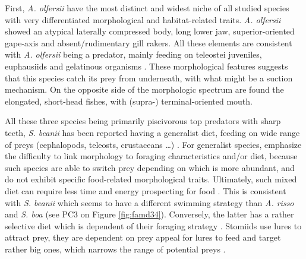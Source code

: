 

First, \textit{A. olfersii} have the most distinct and widest niche of all studied species with very differentiated morphological and habitat-related traits. \textit{A. olfersii} showed an atypical laterally compressed body, long lower jaw, superior-oriented gape-axis and absent/rudimentary gill rakers. All these elements are consistent with \textit{A. olfersii} being a predator, mainly feeding on teleostei juveniles, euphausiids and gelatinous organisms \citep{eduardo2020}. These morphological features suggests that this species catch its prey from underneath, with what might be a suction mechanism. On the opposite side of the morphologic spectrum are found the elongated, short-head fishes, with (supra-) terminal-oriented mouth. 

All these three species being primarily piscivorous top predators with sharp teeth, \textit{S. beanii} has been reported having a generalist diet, feeding on wide range of preys (cephalopods, teleosts, crustaceans \ldots{}) \citep{geidner2008}. For generalist species, \citet{sibbing2000} emphasize the difficulty to link morphology to foraging characteristics and/or diet, because such species are able to switch prey depending on which is more abundant, and do not exhibit specific food-related morphological traits. Ultimately, such mixed diet can require less time and energy prospecting for food \citep{geidner2008}. This is consistent with \textit{S. beanii} which seems to have a different swimming strategy than \textit{A. risso} and \textit{S. boa} (see PC3 on Figure \ref{fig:famd34}). Conversely, the latter has a rather selective diet which is dependent of their foraging strategy \citep{sutton1996}. Stomiids use lures to attract prey, they are dependent on prey appeal for lures to feed and target rather big ones, which narrows the range of potential preys \citep{geidner2008,germain2019}. 

